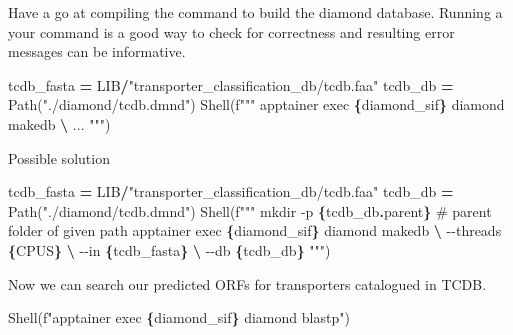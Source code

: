 \documentclass[
]{book}
\newenvironment{Shaded}{\begin{snugshade}}{\end{snugshade}}
\newcommand{\NormalTok}[1]{#1}
\newcommand{\OperatorTok}[1]{\textcolor[rgb]{0.81,0.36,0.00}{\textbf{#1}}}
\newcommand{\SpecialCharTok}[1]{\textcolor[rgb]{0.81,0.36,0.00}{\textbf{#1}}}
\newcommand{\SpecialStringTok}[1]{\textcolor[rgb]{0.31,0.60,0.02}{#1}}
\newcommand{\StringTok}[1]{\textcolor[rgb]{0.31,0.60,0.02}{#1}}
\begin{document}
Have a go at compiling the command to build the diamond database.
Running a your command is a good way to check for correctness and resulting error messages can be informative.

\begin{Shaded}
\begin{Highlighting}[numbers=left,,]
\NormalTok{tcdb\_fasta }\OperatorTok{=}\NormalTok{ LIB}\OperatorTok{/}\StringTok{"transporter\_classification\_db/tcdb.faa"}
\NormalTok{tcdb\_db }\OperatorTok{=}\NormalTok{ Path(}\StringTok{"./diamond/tcdb.dmnd"}\NormalTok{)}
\NormalTok{Shell(}\SpecialStringTok{f"""}
\SpecialStringTok{apptainer exec }\SpecialCharTok{\{}\NormalTok{diamond\_sif}\SpecialCharTok{\}}\SpecialStringTok{ diamond makedb }\OperatorTok{\textbackslash{}}
\SpecialStringTok{    ...}
\SpecialStringTok{"""}\NormalTok{)}
\end{Highlighting}
\end{Shaded}

Possible solution

\begin{Shaded}
\begin{Highlighting}[numbers=left,,]
\NormalTok{tcdb\_fasta }\OperatorTok{=}\NormalTok{ LIB}\OperatorTok{/}\StringTok{"transporter\_classification\_db/tcdb.faa"}
\NormalTok{tcdb\_db }\OperatorTok{=}\NormalTok{ Path(}\StringTok{"./diamond/tcdb.dmnd"}\NormalTok{)}
\NormalTok{Shell(}\SpecialStringTok{f"""}
\SpecialStringTok{mkdir {-}p }\SpecialCharTok{\{}\NormalTok{tcdb\_db}\SpecialCharTok{.}\NormalTok{parent}\SpecialCharTok{\}}\SpecialStringTok{ \# parent folder of given path}
\SpecialStringTok{apptainer exec }\SpecialCharTok{\{}\NormalTok{diamond\_sif}\SpecialCharTok{\}}\SpecialStringTok{ diamond makedb }\OperatorTok{\textbackslash{}}
\SpecialStringTok{    {-}{-}threads }\SpecialCharTok{\{}\NormalTok{CPUS}\SpecialCharTok{\}}\SpecialStringTok{ }\OperatorTok{\textbackslash{}}
\SpecialStringTok{    {-}{-}in }\SpecialCharTok{\{}\NormalTok{tcdb\_fasta}\SpecialCharTok{\}}\SpecialStringTok{ }\OperatorTok{\textbackslash{}}
\SpecialStringTok{    {-}{-}db }\SpecialCharTok{\{}\NormalTok{tcdb\_db}\SpecialCharTok{\}}
\SpecialStringTok{"""}\NormalTok{)}
\end{Highlighting}
\end{Shaded}

Now we can search our predicted ORFs for transporters catalogued in TCDB.

\begin{Shaded}
\begin{Highlighting}[numbers=left,,]
\NormalTok{Shell(}\SpecialStringTok{f"apptainer exec }\SpecialCharTok{\{}\NormalTok{diamond\_sif}\SpecialCharTok{\}}\SpecialStringTok{ diamond blastp"}\NormalTok{)}
\end{Highlighting}
\end{Shaded}
\end{document}
